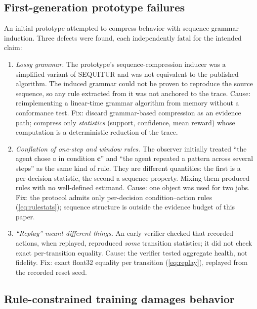 \documentclass[11pt]{article}
\begin{document}
\subsection{First-generation prototype failures}
\label{sec:evolution:v1}

An initial prototype attempted to compress behavior with sequence grammar induction. Three defects
were found, each independently fatal for the intended claim:

\begin{enumerate}
  \item \emph{Lossy grammar.} The prototype's sequence-compression inducer was a simplified variant
        of SEQUITUR \cite{nevillmanning1997identifying} and was not equivalent to the published
        algorithm. The induced grammar could not be proven to reproduce the source sequence, so any
        rule extracted from it was not anchored to the trace. Cause: reimplementing a linear-time
        grammar algorithm from memory without a conformance test. Fix: discard grammar-based
        compression as an evidence path; compress only \emph{statistics} (support, confidence, mean
        reward) whose computation is a deterministic reduction of the trace.
  \item \emph{Conflation of one-step and window rules.} The observer initially treated ``the agent
        chose $a$ in condition $\mathbf{c}$'' and ``the agent repeated a pattern across several
        steps'' as the same kind of rule. They are different quantities: the first is a per-decision
        statistic, the second a sequence property. Mixing them produced rules with no well-defined
        estimand. Cause: one object was used for two jobs. Fix: the protocol admits only per-decision
        condition--action rules (\ref{eq:rulestats}); sequence structure is outside the evidence
        budget of this paper.
  \item \emph{``Replay'' meant different things.} An early verifier checked that recorded actions,
        when replayed, reproduced \emph{some} transition statistics; it did not check exact
        per-transition equality. Cause: the verifier tested aggregate health, not fidelity. Fix:
        exact float32 equality per transition (\ref{eq:replay}), replayed from the recorded reset
        seed.
\end{enumerate}

\subsection{Rule-constrained training damages behavior}
\label{sec:evolution:constraint}
\end{document}
